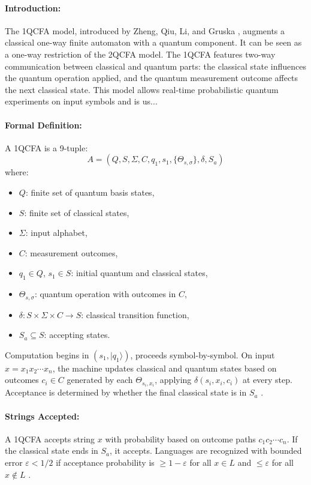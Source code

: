 \paragraph{Introduction:}  
The 1QCFA model, introduced by Zheng, Qiu, Li, and Gruska \cite{zheng2012one}, augments a classical one-way finite automaton with a quantum component. It can be seen as a one-way restriction of the 2QCFA model. The 1QCFA features two-way communication between classical and quantum parts: the classical state influences the quantum operation applied, and the quantum measurement outcome affects the next classical state. This model allows real-time probabilistic quantum experiments on input symbols and is us...

\paragraph{Formal Definition:}  
A 1QCFA is a 9-tuple:
\[
A = (Q, S, \Sigma, C, q_1, s_1, \{\Theta_{s,\sigma}\}, \delta, S_a)
\]
where:
\begin{itemize}
    \item $Q$: finite set of quantum basis states,
    \item $S$: finite set of classical states,
    \item $\Sigma$: input alphabet,
    \item $C$: measurement outcomes,
    \item $q_1 \in Q$, $s_1 \in S$: initial quantum and classical states,
    \item $\Theta_{s,\sigma}$: quantum operation with outcomes in $C$,
    \item $\delta: S \times \Sigma \times C \to S$: classical transition function,
    \item $S_a \subseteq S$: accepting states.
\end{itemize}
Computation begins in $(s_1, |q_1\rangle)$, proceeds symbol-by-symbol. On input $x = x_1x_2\cdots x_n$, the machine updates classical and quantum states based on outcomes $c_i \in C$ generated by each $\Theta_{s_i,x_i}$, applying $\delta(s_i,x_i,c_i)$ at every step. Acceptance is determined by whether the final classical state is in $S_a$ \cite{li2015hybrid}.

\paragraph{Strings Accepted:}  
A 1QCFA accepts string $x$ with probability based on outcome paths $c_1c_2\cdots c_n$. If the classical state ends in $S_a$, it accepts. Languages are recognized with bounded error $\varepsilon < 1/2$ if acceptance probability is $\geq 1-\varepsilon$ for all $x \in L$ and $\leq \varepsilon$ for all $x \notin L$ \cite{li2015hybrid, zheng2012one}.

